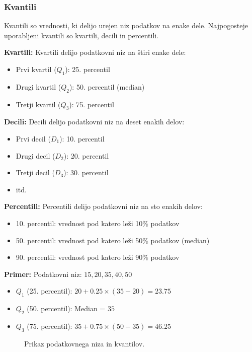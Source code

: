 \subsubsection*{Kvantili}

Kvantili so vrednosti, ki delijo urejen niz podatkov na enake dele. Najpogosteje uporabljeni kvantili so kvartili, decili in percentili.

\textbf{Kvartili:}
Kvartili delijo podatkovni niz na štiri enake dele:
\begin{itemize}
    \item Prvi kvartil ($Q_1$): 25. percentil
    \item Drugi kvartil ($Q_2$): 50. percentil (median)
    \item Tretji kvartil ($Q_3$): 75. percentil
\end{itemize}

\textbf{Decili:}
Decili delijo podatkovni niz na deset enakih delov:
\begin{itemize}
    \item Prvi decil ($D_1$): 10. percentil
    \item Drugi decil ($D_2$): 20. percentil
    \item Tretji decil ($D_3$): 30. percentil
    \item itd.
\end{itemize}

\textbf{Percentili:}
Percentili delijo podatkovni niz na sto enakih delov:
\begin{itemize}
    \item 10. percentil: vrednost pod katero leži 10\% podatkov
    \item 50. percentil: vrednost pod katero leži 50\% podatkov (median)
    \item 90. percentil: vrednost pod katero leži 90\% podatkov
\end{itemize}

\textbf{Primer:}
Podatkovni niz: $15, 20, 35, 40, 50$
\begin{itemize}
    \item $Q_1$ (25. percentil): $20 + 0.25 \times (35 - 20) = 23.75$
    \item $Q_2$ (50. percentil): Median = $35$
    \item $Q_3$ (75. percentil): $35 + 0.75 \times (50 - 35) = 46.25$
\end{itemize}

\begin{figure}
\centering
{}
\caption{Prikaz podatkovnega niza in kvantilov.}
\end{figure}

